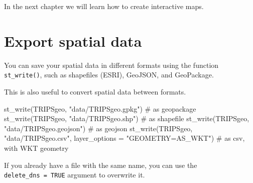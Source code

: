 \documentclass[
  letterpaper,
  DIV=11,
  numbers=noendperiod]{scrreprt}
\newenvironment{Shaded}{\begin{snugshade}}{\end{snugshade}}
\newcommand{\AttributeTok}[1]{\textcolor[rgb]{0.40,0.45,0.13}{#1}}
\newcommand{\CommentTok}[1]{\textcolor[rgb]{0.37,0.37,0.37}{#1}}
\newcommand{\FunctionTok}[1]{\textcolor[rgb]{0.28,0.35,0.67}{#1}}
\newcommand{\NormalTok}[1]{\textcolor[rgb]{0.00,0.23,0.31}{#1}}
\newcommand{\StringTok}[1]{\textcolor[rgb]{0.13,0.47,0.30}{#1}}
\begin{document}
\begin{tcolorbox}[enhanced jigsaw, breakable, left=2mm, colframe=quarto-callout-note-color-frame, leftrule=.75mm, bottomrule=.15mm, arc=.35mm, rightrule=.15mm, colback=white, opacityback=0, toprule=.15mm]
\begin{minipage}[t]{5.5mm}
\textcolor{quarto-callout-note-color}{\faInfo}
\end{minipage}%
\begin{minipage}[t]{\textwidth - 5.5mm}

In the next chapter we will learn how to create interactive maps.

\end{minipage}%
\end{tcolorbox}

\section{Export spatial data}\label{export-spatial-data}

You can save your spatial data in different formats using the function
\texttt{st\_write()}, such as shapefiles (ESRI), GeoJSON, and
GeoPackage.

This is also useful to convert spatial data between formats.

\begin{Shaded}
\begin{Highlighting}[]
\FunctionTok{st\_write}\NormalTok{(TRIPSgeo, }\StringTok{"data/TRIPSgeo.gpkg"}\NormalTok{) }\CommentTok{\# as geopackage}
\FunctionTok{st\_write}\NormalTok{(TRIPSgeo, }\StringTok{"data/TRIPSgeo.shp"}\NormalTok{) }\CommentTok{\# as shapefile}
\FunctionTok{st\_write}\NormalTok{(TRIPSgeo, }\StringTok{"data/TRIPSgeo.geojson"}\NormalTok{) }\CommentTok{\# as geojson}
\FunctionTok{st\_write}\NormalTok{(TRIPSgeo, }\StringTok{"data/TRIPSgeo.csv"}\NormalTok{, }\AttributeTok{layer\_options =} \StringTok{"GEOMETRY=AS\_WKT"}\NormalTok{) }\CommentTok{\# as csv, with WKT geometry}
\end{Highlighting}
\end{Shaded}

\begin{tcolorbox}[enhanced jigsaw, breakable, left=2mm, colframe=quarto-callout-warning-color-frame, leftrule=.75mm, bottomrule=.15mm, arc=.35mm, rightrule=.15mm, colback=white, opacityback=0, toprule=.15mm]
\begin{minipage}[t]{5.5mm}
\textcolor{quarto-callout-warning-color}{\faExclamationTriangle}
\end{minipage}%
\begin{minipage}[t]{\textwidth - 5.5mm}

If you already have a file with the same name, you can use the
\texttt{delete\_dns\ =\ TRUE} argument to overwrite it.

\end{minipage}%
\end{tcolorbox}
\end{document}
